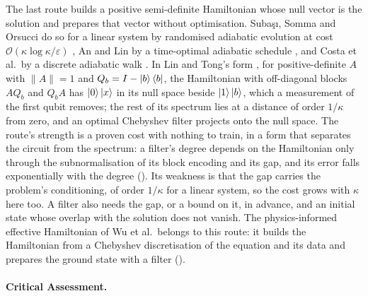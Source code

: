 The last route builds a positive semi-definite Hamiltonian whose null vector is the solution and prepares that vector without optimisation. Subaşı, Somma and Orsucci do so for a linear system by randomised adiabatic evolution at cost $\mathcal O(\kappa\log\kappa/\varepsilon)$ \cite{subasi2019adiabatic}, An and Lin by a time-optimal adiabatic schedule \cite{anlin2022timeoptimal}, and Costa et al.\ by a discrete adiabatic walk \cite{costa2022optimal}. In Lin and Tong's form \cite{lintong2020filtering}, for positive-definite $A$ with $\|A\|=1$ and $Q_b=I-\ket{b}\bra{b}$, the Hamiltonian with off-diagonal blocks $AQ_b$ and $Q_bA$ has $\ket{0}\ket{x}$ in its null space beside $\ket{1}\ket{b}$, which a measurement of the first qubit removes; the rest of its spectrum lies at a distance of order $1/\kappa$ from zero, and an optimal Chebyshev filter projects onto the null space. The route's strength is a proven cost with nothing to train, in a form that separates the circuit from the spectrum: a filter's degree depends on the Hamiltonian only through the subnormalisation of its block encoding and its gap, and its error falls exponentially with the degree (). Its weakness is that the gap carries the problem's conditioning, of order $1/\kappa$ for a linear system, so the cost grows with $\kappa$ here too. A filter also needs the gap, or a bound on it, in advance, and an initial state whose overlap with the solution does not vanish. The physics-informed effective Hamiltonian of Wu et al.\ belongs to this route: it builds the Hamiltonian from a Chebyshev discretisation of the equation and its data and prepares the ground state with a filter ().

\paragraph{Critical Assessment.}
\label{sec:bg-de-assessment}

